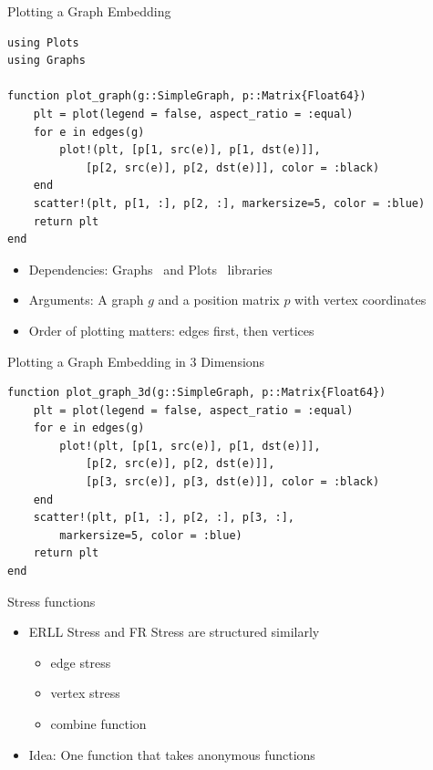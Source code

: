 \documentclass{beamer}
\begin{document}
\begin{frame}[fragile]{Plotting a Graph Embedding}
\begin{verbatim}
using Plots
using Graphs

function plot_graph(g::SimpleGraph, p::Matrix{Float64})
    plt = plot(legend = false, aspect_ratio = :equal)
    for e in edges(g)
        plot!(plt, [p[1, src(e)], p[1, dst(e)]],
            [p[2, src(e)], p[2, dst(e)]], color = :black)
    end
    scatter!(plt, p[1, :], p[2, :], markersize=5, color = :blue)
    return plt
end
\end{verbatim}
\end{frame}

\begin{frame}
\begin{itemize}
    \item Dependencies: Graphs~\cite{graphsjl} and Plots~\cite{plotsjl} libraries
    \item Arguments: A graph $g$ and a position matrix $p$ with vertex coordinates
    \item Order of plotting matters: edges first, then vertices
\end{itemize}
\end{frame}

\begin{frame}[fragile]{Plotting a Graph Embedding in 3 Dimensions}
\begin{verbatim}
function plot_graph_3d(g::SimpleGraph, p::Matrix{Float64})
    plt = plot(legend = false, aspect_ratio = :equal)
    for e in edges(g)
        plot!(plt, [p[1, src(e)], p[1, dst(e)]],
            [p[2, src(e)], p[2, dst(e)]],
            [p[3, src(e)], p[3, dst(e)]], color = :black)
    end
    scatter!(plt, p[1, :], p[2, :], p[3, :],
        markersize=5, color = :blue)
    return plt
end
\end{verbatim}
\end{frame}

\begin{frame}{Stress functions}
    \begin{itemize}
        \item ERLL Stress and FR Stress are structured similarly
        \begin{itemize}
            \item edge stress
            \item vertex stress
            \item combine function
        \end{itemize}
        \item Idea: One function that takes anonymous functions
    \end{itemize}
\end{frame}
\end{document}
